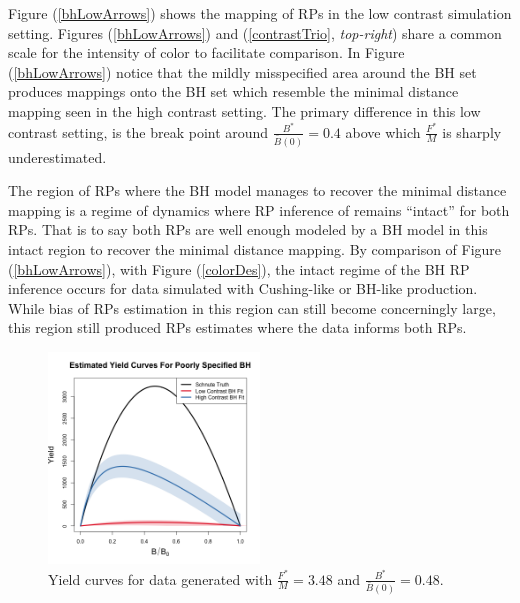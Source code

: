 %
Figure (\ref{bhLowArrows}) shows the mapping of RPs in the low contrast
simulation setting. Figures (\ref{bhLowArrows}) and (\ref{contrastTrio},
\emph{top-right}) share a common scale for the intensity of color to
facilitate comparison. In Figure (\ref{bhLowArrows}) notice that the mildly
misspecified area around the BH set produces mappings onto the BH set which
resemble the minimal distance mapping seen in the high contrast setting. %
The primary difference in this low contrast setting, is the break point
around $\frac{B^*}{\bar B(0)}=0.4$ above which $\frac{F^*}{M}$ is sharply
underestimated.

The region of RPs where the BH model manages to recover the minimal 
distance mapping is a regime of dynamics where RP inference of remains 
``intact'' for both RPs.
That is to say both RPs are well enough modeled by a BH model in this intact 
region to recover the minimal distance mapping. By comparison of 
Figure (\ref{bhLowArrows}), with Figure (\ref{colorDes}), the intact regime of 
the BH RP inference occurs for data simulated with Cushing-like or BH-like production. 
While bias of RPs estimation in this region can still become concerningly large, 
this region still produced RPs estimates where the data informs both RPs.

%
\begin{figure}
\vspace{-0.75cm}
\includegraphics[width=0.5\textwidth]{../gpBias/yeildRelCurveCompareHHardFlatT30N150WWideN112PrettyX3.4791Z0.4662.png}
\vspace{-1cm}
\caption{
Yield curves for data generated with $\frac{F^*}{M}=3.48$ and $\frac{B^*}{\bar B(0)}=0.48$.
}
\label{bhFmsy}
\end{figure}


